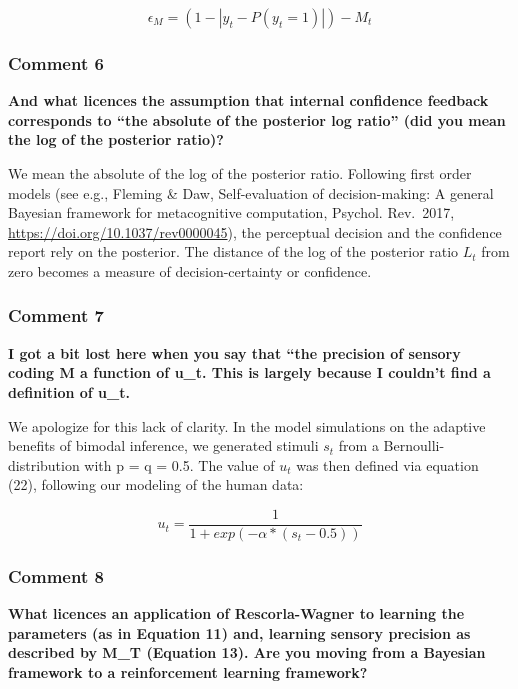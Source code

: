 \documentclass[
]{article}
\begin{document}
\begin{equation}
\epsilon_M = (1-|y_t - P(y_t = 1)|) - M_t
\end{equation}

\hypertarget{comment-6}{%
\subsubsection{Comment 6}\label{comment-6}}

\textbf{And what licences the assumption that internal confidence
feedback corresponds to ``the absolute of the posterior log ratio'' (did
you mean the log of the posterior ratio)?}

We mean the absolute of the log of the posterior ratio. Following first
order models (see e.g., Fleming \& Daw, Self-evaluation of
decision-making: A general Bayesian framework for metacognitive
computation, Psychol. Rev.~2017,
\url{https://doi.org/10.1037/rev0000045}), the perceptual decision and
the confidence report rely on the posterior. The distance of the log of
the posterior ratio \(L_t\) from zero becomes a measure of
decision-certainty or confidence.

\hypertarget{comment-7}{%
\subsubsection{Comment 7}\label{comment-7}}

\textbf{I got a bit lost here when you say that ``the precision of
sensory coding M a function of u\_t. This is largely because I couldn't
find a definition of u\_t.}

We apologize for this lack of clarity. In the model simulations on the
adaptive benefits of bimodal inference, we generated stimuli \(s_t\)
from a Bernoulli-distribution with p = q = 0.5. The value of \(u_t\) was
then defined via equation (22), following our modeling of the human
data:

\begin{equation}
u_t = \frac{1}{1+exp(-\alpha*(s_t-0.5))}
\end{equation}

\hypertarget{comment-8}{%
\subsubsection{Comment 8}\label{comment-8}}

\textbf{What licences an application of Rescorla-Wagner to learning the
parameters (as in Equation 11) and, learning sensory precision as
described by M\_T (Equation 13). Are you moving from a Bayesian
framework to a reinforcement learning framework?}
\end{document}
